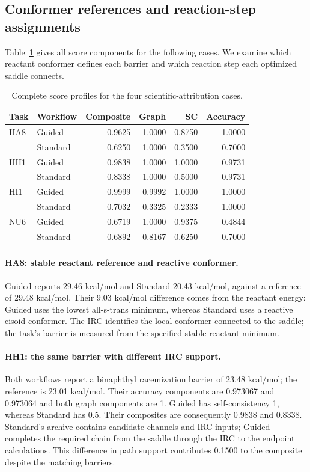 \subsection{Conformer references and reaction-step assignments}

Table~\ref{tab:si-case-profiles} gives all score components for the following cases. We examine which reactant conformer defines each barrier and which reaction step each optimized saddle connects.

\begin{table}[!htbp]
\centering
\small
\caption{Complete score profiles for the four scientific-attribution cases.}
\label{tab:si-case-profiles}
\begin{tabular}{llrrrr}
\toprule
Task & Workflow & Composite & Graph & SC & Accuracy \\
\midrule
HA8 & Guided & 0.9625 & 1.0000 & 0.8750 & 1.0000 \\
 & Standard & 0.6250 & 1.0000 & 0.3500 & 0.7000 \\
HH1 & Guided & 0.9838 & 1.0000 & 1.0000 & 0.9731 \\
 & Standard & 0.8338 & 1.0000 & 0.5000 & 0.9731 \\
HI1 & Guided & 0.9999 & 0.9992 & 1.0000 & 1.0000 \\
 & Standard & 0.7032 & 0.3325 & 0.2333 & 1.0000 \\
NU6 & Guided & 0.6719 & 1.0000 & 0.9375 & 0.4844 \\
 & Standard & 0.6892 & 0.8167 & 0.6250 & 0.7000 \\
\bottomrule
\end{tabular}
\end{table}

\paragraph{HA8: stable reactant reference and reactive conformer.}
Guided reports 29.46 kcal/mol and Standard 20.43 kcal/mol, against a reference of 29.48 kcal/mol. Their 9.03 kcal/mol difference comes from the reactant energy: Guided uses the lowest all-s-trans minimum, whereas Standard uses a reactive cisoid conformer. The IRC identifies the local conformer connected to the saddle; the task's barrier is measured from the specified stable reactant minimum.

\paragraph{HH1: the same barrier with different IRC support.}
Both workflows report a binaphthyl racemization barrier of 23.48 kcal/mol; the reference is 23.01 kcal/mol. Their accuracy components are 0.973067 and 0.973064 and both graph components are 1. Guided has self-consistency 1, whereas Standard has 0.5. Their composites are consequently 0.9838 and 0.8338. Standard's archive contains candidate channels and IRC inputs; Guided completes the required chain from the saddle through the IRC to the endpoint calculations. This difference in path support contributes 0.1500 to the composite despite the matching barriers.


